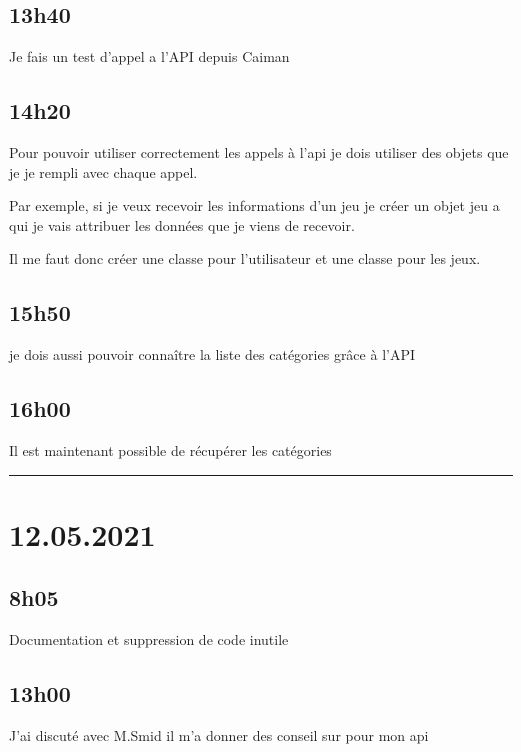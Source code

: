 \documentclass[a4paper,12pt,french]{sphinxmanual}
\begin{document}
\subsection{13h40}
\label{\detokenize{logbook:id100}}
\sphinxAtStartPar
Je fais un test d’appel a l’API depuis Caiman


\subsection{14h20}
\label{\detokenize{logbook:id101}}
\sphinxAtStartPar
Pour pouvoir utiliser correctement les appels à l’api je dois utiliser des objets que je je rempli avec chaque appel.

\sphinxAtStartPar
Par exemple, si je veux recevoir les informations d’un jeu je créer un objet jeu a qui je vais attribuer les données que je viens de recevoir.

\sphinxAtStartPar
Il me faut donc créer une classe pour l’utilisateur et une classe pour les jeux.


\subsection{15h50}
\label{\detokenize{logbook:id102}}
\sphinxAtStartPar
je dois aussi pouvoir connaître la liste des catégories grâce à l’API


\subsection{16h00}
\label{\detokenize{logbook:id103}}
\sphinxAtStartPar
Il est maintenant possible de récupérer les catégories


\bigskip\hrule\bigskip



\section{12.05.2021}
\label{\detokenize{logbook:id104}}

\subsection{8h05}
\label{\detokenize{logbook:id105}}
\sphinxAtStartPar
Documentation et suppression de code inutile


\subsection{13h00}
\label{\detokenize{logbook:id106}}
\sphinxAtStartPar
J’ai discuté avec M.Smid il m’a donner des conseil sur pour mon api
\end{document}
